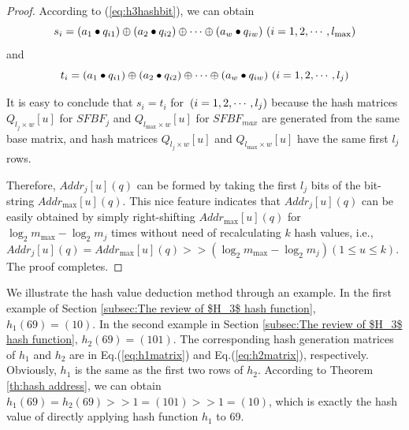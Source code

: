 \documentclass[10pt,journal,compsoc]{IEEEtran}
\newtheorem{proof}{Proof}
\begin{document}
\begin{proof}
According to (\ref{eq:h3hashbit}), we can obtain
\begin{equation}
\footnotesize
{s_i} = \left( {{a_1} \bullet {q_{i1}}} \right) \oplus \left( {{a_2} \bullet {q_{i2}}} \right) \oplus  \cdots  \oplus \left( {{a_w} \bullet {q_{iw}}} \right){\rm{   }}\left( {i = 1,2, \cdots ,{l_{\max }}} \right)
\end{equation}
and
\begin{equation}
\footnotesize
{t_i} = \left( {{a_1} \bullet {q_{i1}}} \right) \oplus \left( {{a_2} \bullet {q_{i2}}} \right) \oplus  \cdots  \oplus \left( {{a_w} \bullet {q_{iw}}} \right){\rm{   }}\left( {i = 1,2, \cdots ,{l_j}} \right)
\end{equation}

It is easy to conclude that ${s_i} = {t_i}$ for ${\rm{ }}\left( {i = 1,2, \cdots ,{l_j}} \right)$ because the hash matrices ${Q_{l_j \times w}}\left[ u \right]$ for $SFBF_j$ and ${Q_{{l_{\max }} \times w}}[u]$ for $SFBF_{max}$ are generated from the same base matrix, and hash matrices ${Q_{l_j \times w}}\left[ u \right]$ and ${Q_{{l_{\max }} \times w}}[u]$ have the same first $l_j$ rows.%

Therefore, $Add{r_j}\left[ u \right](q)$ can be formed by taking the first $l_j$ bits of the bit-string $Add{r_{\max }}\left[ u \right](q)$. This nice feature indicates that $Add{r_j}\left[ u \right](q)$ can be easily obtained
by simply right-shifting $Add{r_{\max }}\left[ u \right](q)$ for ${\log _2}{m_{\max }} - {\log _2}{m_j}$ times without need of recalculating $k$ hash values, i.e., $Add{r_j}\left[ u \right](q) = Add{r_{\max }}\left[ u \right] (q)>  >( {\log _2}{m_{\max }} - {\log _2}{m_j})\left( {1 \le u \le k} \right)$. The proof completes.
\end{proof}

We illustrate the hash value deduction method through an example. In the first example of Section \ref{subsec:The review of $H_3$ hash function}, $h_1(69)=(10)$. In the second example in Section \ref{subsec:The review of $H_3$ hash function}, $h_2(69)=(101)$. The corresponding hash generation matrices of $h_1$ and $h_2$ are in Eq.(\ref{eq:h1matrix}) and Eq.(\ref{eq:h2matrix}), respectively. Obviously, $h_1$ is the same as the first two rows of $h_2$. According to Theorem \ref{th:hash address}, we can obtain $h_1(69)=h_2(69)>>1=(101)>>1=(10)$, which is exactly the hash value of directly applying hash function $h_1$ to 69.
\end{document}
